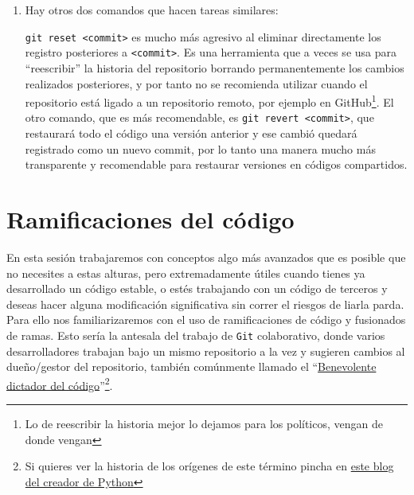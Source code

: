 \documentclass[a4paper,11pt]{report}
\newcommand{\cverb}{\Verb}
\begin{document}
\begin{enumerate}
    \item Hay otros dos comandos que hacen tareas similares:     
    
    \cverb+git reset <commit>+ es mucho más agresivo al eliminar directamente los registro posteriores a \verb+<commit>+. Es una herramienta que a veces se usa para ``reescribir'' la historia del repositorio borrando permanentemente los cambios realizados posteriores, y por tanto no se recomienda utilizar cuando el repositorio está ligado a un repositorio remoto, por ejemplo en GitHub\footnote{Lo de reescribir la historia mejor lo dejamos para los políticos, vengan de donde vengan}. El otro comando, que es más recomendable, es \cverb+git revert <commit>+, que restaurará todo el código una versión anterior y ese cambió quedará registrado como un nuevo commit, por lo tanto una manera mucho más transparente y recomendable para restaurar versiones en códigos compartidos.
    
   \end{enumerate}
   
  \section{Ramificaciones del código}
    En esta sesión trabajaremos con conceptos algo más avanzados que es posible que no necesites a estas alturas, pero extremadamente útiles cuando tienes ya desarrollado un código estable, o estés trabajando con un código de terceros y deseas hacer alguna modificación significativa sin correr el riesgos de liarla parda. Para ello nos familiarizaremos con el uso de ramificaciones de código y fusionados de ramas. Esto sería la antesala del trabajo de \verb+Git+ colaborativo, donde varios desarrolladores trabajan bajo un mismo repositorio a la vez y sugieren cambios al dueño/gestor del repositorio, también comúnmente llamado el ``\href{http://catb.org/~esr/writings/homesteading/homesteading/ar01s16.html}{Benevolente dictador del código}''\footnote{Si quieres ver la historia de los orígenes de este término pincha en \href{https://www.artima.com/weblogs/viewpost.jsp?thread=235725}{este blog del creador de Python}}.
    
\end{document}
